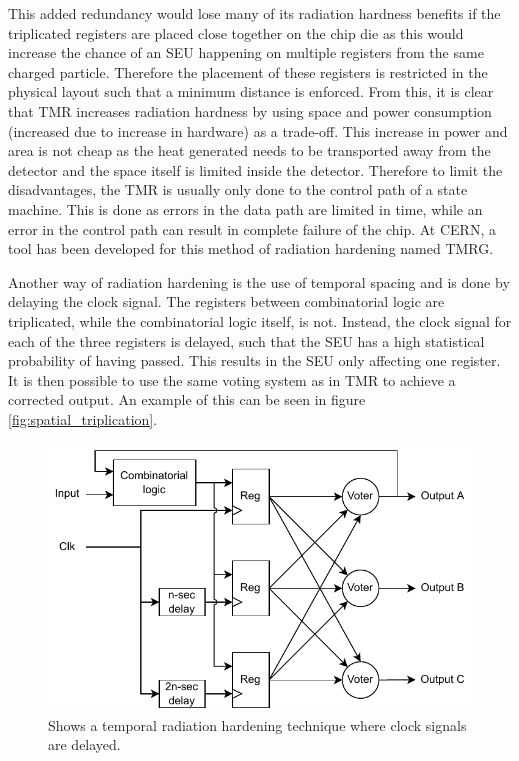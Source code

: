 This added redundancy would lose many of its radiation hardness benefits if the triplicated registers are placed close together on the chip die as this would increase the chance of an SEU happening on multiple registers from the same charged particle. Therefore the placement of these registers is restricted in the physical layout such that a minimum distance is enforced. 
From this, it is clear that TMR increases radiation hardness by using space and power consumption (increased due to increase in hardware) as a trade-off. This increase in power and area is not cheap as the heat generated needs to be transported away from the detector and the space itself is limited inside the detector. Therefore to limit the disadvantages, the TMR is usually only done to the control path of a state machine. This is done as errors in the data path are limited in time, while an error in the control path can result in complete failure of the chip. At CERN, a tool has been developed for this method of radiation hardening named TMRG.

Another way of radiation hardening is the use of temporal spacing and is done by delaying the clock signal. The registers between combinatorial logic are triplicated, while the combinatorial logic itself, is not. Instead, the clock signal for each of the three registers is delayed, such that the SEU has a high statistical probability of having passed. This results in the SEU only affecting one register. It is then possible to use the same voting system as in TMR to achieve a corrected output. An example of this can be seen in figure \ref{fig:spatial_triplication}.

\begin{figure}[H]
    \centering
    \includegraphics[width=0.7\linewidth]{subfiles/imgs/temporalTriplication.drawio.pdf}
    \caption{Shows a temporal radiation hardening technique where clock signals are delayed.}
    \label{fig:temporal_triplication}
\end{figure}

